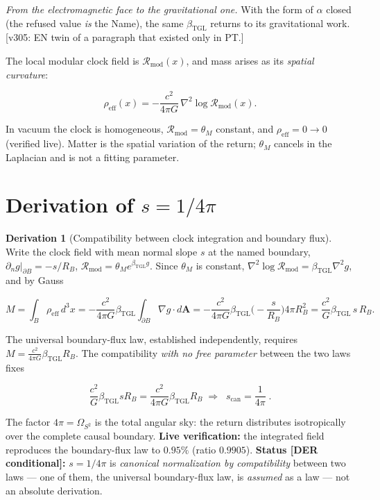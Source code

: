 \documentclass[11pt]{article}
\newcommand{\bTGL}{\beta_{\mathrm{TGL}}}\newcommand{\Msun}{M_{\odot}}\newcommand{\TGL}{\mathrm{TGL}}
\theoremstyle{definition}\newtheorem{deriv}{Derivation}
\begin{document}
\emph{From the electromagnetic face to the gravitational one.} With the form of $\alpha$ closed (the refused value \emph{is} the Name), the same $\bTGL$ returns to its gravitational work. [v305: EN twin of a paragraph that existed only in PT.]

The local modular clock field is $\mathcal{R}_{\mathrm{mod}}(x)$, and mass arises as its \emph{spatial curvature}:

\begin{equation}\rho_{\mathrm{eff}}(x)=-\frac{c^2}{4\pi G}\,\nabla^2\log \mathcal{R}_{\mathrm{mod}}(x).\end{equation}

In vacuum the clock is homogeneous, $\mathcal{R}_{\mathrm{mod}}=\theta_M$ constant, and $\rho_{\mathrm{eff}}=0\to 0$ (verified live). Matter is the spatial variation of the return; $\theta_M$ cancels in the Laplacian and is not a fitting parameter.

\section{Derivation of $s=1/4\pi$}

\begin{deriv}[Compatibility between clock integration and boundary flux]

Write the clock field with mean normal slope $s$ at the named boundary, $\partial_n g|_{\partial B}=-s/R_B$, $\mathcal{R}_{\mathrm{mod}}=\theta_M e^{\bTGL g}$. Since $\theta_M$ is constant, $\nabla^2\log\mathcal{R}_{\mathrm{mod}}=\bTGL\nabla^2 g$, and by Gauss

\begin{equation}M=\int_B\rho_{\mathrm{eff}}\,d^3x=-\frac{c^2}{4\pi G}\bTGL\!\int_{\partial B}\!\nabla g\cdot d\mathbf{A}=-\frac{c^2}{4\pi G}\bTGL\Big(\!-\frac{s}{R_B}\Big)4\pi R_B^2=\frac{c^2}{G}\bTGL\,s\,R_B.\end{equation}

The universal boundary-flux law, established independently, requires $M=\frac{c^2}{4\pi G}\bTGL R_B$. The compatibility \emph{with no free parameter} between the two laws fixes

\begin{equation}\frac{c^2}{G}\bTGL s R_B=\frac{c^2}{4\pi G}\bTGL R_B\;\Longrightarrow\;\boxed{\;s_{\mathrm{can}}=\frac{1}{4\pi}\;}.\end{equation}

The factor $4\pi=\Omega_{S^2}$ is the total angular sky: the return distributes isotropically over the complete causal boundary. \textbf{Live verification:} the integrated field reproduces the boundary-flux law to $0.95\%$ (ratio $0.9905$). \textbf{Status \textsf{[DER conditional]}:} $s=1/4\pi$ is \emph{canonical normalization by compatibility} between two laws --- one of them, the universal boundary-flux law, is \emph{assumed} as a law --- not an absolute derivation.\end{deriv}
\end{document}
